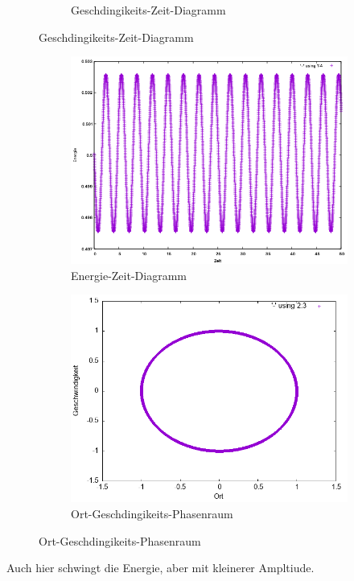 \documentclass[
    oneside,
    ngerman,
    footinclude=false,
    captions=tableheading,
    DIV=12
]{scrartcl}
\begin{document}
\begin{figure}[H]
\begin{subfigure}[b]{0.45\textwidth}
                        \caption{Geschdingikeits-Zeit-Diagramm}
                        \label{fig:expEulerA1(a)-001-0-v}
                    \end{subfigure}
                \end{figure}
                
                \begin{figure}[H]
                \centering
                \begin{subfigure}[b]{0.45\textwidth}
                    \centering
                    \includegraphics[width=\textwidth]{Bilddateien/expEulerA1(a)-001h-E.png}
                    \caption{Energie-Zeit-Diagramm}
                    \label{fig:expEulerA1(a)-001-0-E}
                \end{subfigure}
                \hfill
                \begin{subfigure}[b]{0.45\textwidth}
                    \centering
                    \includegraphics[width=\textwidth]{Bilddateien/expEulerA1(a)-001-0-xv.png}
                    \caption{Ort-Geschdingikeits-Phasenraum}
                    \label{fig:expEulerA1(a)-001-0-xv}
                \end{subfigure}
                \end{figure}
                Auch hier schwingt die Energie, aber mit kleinerer Ampltiude.
\end{document}
